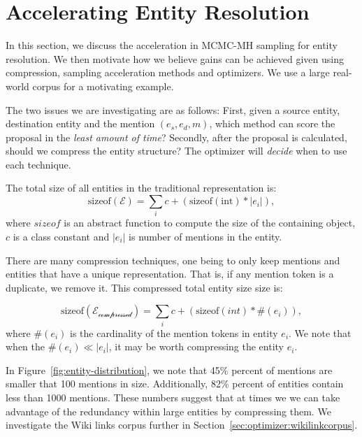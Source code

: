 
\section{Accelerating Entity Resolution}
\label{sec:optimizer:example}

In this section, we discuss the acceleration in MCMC-MH sampling for entity resolution.
We then motivate how we believe gains can be achieved given using compression,
sampling acceleration methods and optimizers.
We use a large real-world corpus for a motivating example.

The two issues we are investigating are as follows:
First, given a source entity, 
destination entity and the mention \((e_s, e_d, m)\), which method can score the proposal in the \textit{least amount of time}?
Secondly, after the proposal is calculated, should we compress the entity structure?
The optimizer will \textit{decide} when to use each technique.

The total size of all entities in the traditional representation is:
\begin{equation}
  \text{sizeof}(\mathcal{E}) =  \sum_i c + (\text{sizeof}(\text{int}) * |e_i|),
\end{equation}
where $sizeof$ is an abstract function to compute the size of the containing object,
$c$ is a class constant and $|e_i|$ is number of mentions in the entity.

There are many compression techniques, one being to only keep  mentions and entities
that have a unique representation.
That is, if any mention token is a duplicate, we remove it.
This compressed total entity size size is:

\begin{equation}
  \text{sizeof}(\mathcal{E_\text{compressed}}) = \sum_i c + (\text{sizeof}(int) * \#(e_i) ),
\end{equation}
where $\#(e_i)$ is the cardinality of the mention tokens in entity $e_i$.
We note that when the $\#(e_i) \ll |e_i|$, it may be worth compressing the entity $e_i$.


In Figure~\ref{fig:entity-distribution}, we note that
45\% percent of mentions are smaller that 100 mentions in size.
Additionally, 82\% percent of entities contain less than 1000 mentions.
These numbers suggest that at times we we can take advantage of the redundancy within
large entities by compressing them.
We investigate the Wiki links corpus further in Section~\ref{sec:optimizer:wikilinkcorpus}. 


